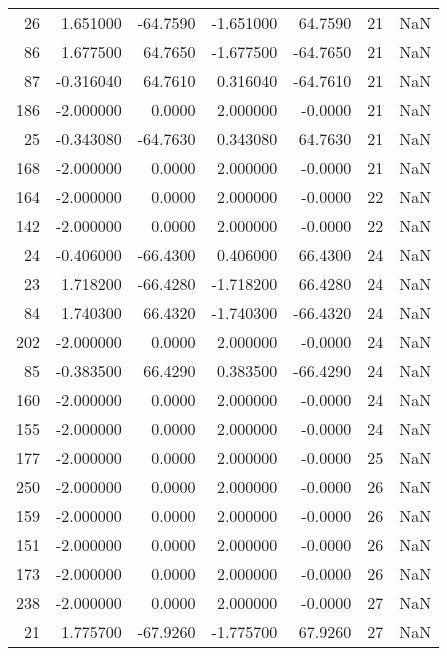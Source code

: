 \begin{tabular}{rrrrrrr}
 26 &   1.651000 &  -64.7590 &  -1.651000 &     64.7590 &          21 & NaN \\
 86 &   1.677500 &   64.7650 &  -1.677500 &    -64.7650 &          21 & NaN \\
 87 &  -0.316040 &   64.7610 &   0.316040 &    -64.7610 &          21 & NaN \\
186 &  -2.000000 &    0.0000 &   2.000000 &     -0.0000 &          21 & NaN \\
 25 &  -0.343080 &  -64.7630 &   0.343080 &     64.7630 &          21 & NaN \\
168 &  -2.000000 &    0.0000 &   2.000000 &     -0.0000 &          21 & NaN \\
164 &  -2.000000 &    0.0000 &   2.000000 &     -0.0000 &          22 & NaN \\
142 &  -2.000000 &    0.0000 &   2.000000 &     -0.0000 &          22 & NaN \\
 24 &  -0.406000 &  -66.4300 &   0.406000 &     66.4300 &          24 & NaN \\
 23 &   1.718200 &  -66.4280 &  -1.718200 &     66.4280 &          24 & NaN \\
 84 &   1.740300 &   66.4320 &  -1.740300 &    -66.4320 &          24 & NaN \\
202 &  -2.000000 &    0.0000 &   2.000000 &     -0.0000 &          24 & NaN \\
 85 &  -0.383500 &   66.4290 &   0.383500 &    -66.4290 &          24 & NaN \\
160 &  -2.000000 &    0.0000 &   2.000000 &     -0.0000 &          24 & NaN \\
155 &  -2.000000 &    0.0000 &   2.000000 &     -0.0000 &          24 & NaN \\
177 &  -2.000000 &    0.0000 &   2.000000 &     -0.0000 &          25 & NaN \\
250 &  -2.000000 &    0.0000 &   2.000000 &     -0.0000 &          26 & NaN \\
159 &  -2.000000 &    0.0000 &   2.000000 &     -0.0000 &          26 & NaN \\
151 &  -2.000000 &    0.0000 &   2.000000 &     -0.0000 &          26 & NaN \\
173 &  -2.000000 &    0.0000 &   2.000000 &     -0.0000 &          26 & NaN \\
238 &  -2.000000 &    0.0000 &   2.000000 &     -0.0000 &          27 & NaN \\
 21 &   1.775700 &  -67.9260 &  -1.775700 &     67.9260 &          27 & NaN \\

\end{tabular}
